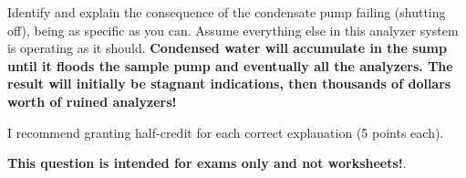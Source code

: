 \vskip 10pt

Identify and explain the consequence of the condensate pump failing (shutting off), being as specific as you can.  Assume everything else in this analyzer system is operating as it should.  {\bf Condensed water will accumulate in the sump until it floods the sample pump and eventually all the analyzers.  The result will initially be stagnant indications, then thousands of dollars worth of ruined analyzers!}

\vskip 10pt

I recommend granting half-credit for each correct explanation (5 points each).







{\bf This question is intended for exams only and not worksheets!}.


